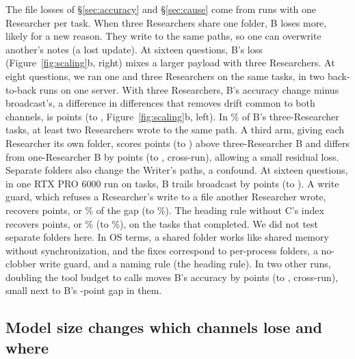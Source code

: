 \documentclass[sigplan,10pt,nonacm,review,anonymous]{acmart}
\begin{document}
The file losses of \S\ref{sec:accuracy} and \S\ref{sec:cause} come from runs with one Researcher per task. When three
Researchers share one folder, B loses more, likely for a new reason. They write to the same paths, so one can
overwrite another's notes (a lost update). At sixteen questions, B's loss (Figure~\ref{fig:scaling}b, right)
mixes a larger payload with three Researchers. At eight questions, we ran one and three Researchers on the
same \nREightFanBN tasks, in two back-to-back runs on one server. With three Researchers, B's accuracy change
minus broadcast's, a difference in differences that removes drift common to both channels, is
\nREightFanDiD points (\nREightFanDiDLo to \nREightFanDiDHi, Figure~\ref{fig:scaling}b, left). In \nREightClashB{}\% of B's three-Researcher
tasks, at least two Researchers wrote to the same path. A third arm, giving each Researcher its own folder,
scores \nREightFoldersOverB points (\nREightFoldersOverBLo to \nREightFoldersOverBHi) above three-Researcher B
and differs from one-Researcher B by \nREightFoldersVsOne points (\nREightFoldersVsOneLo to
\nREightFoldersVsOneHi, cross-run), allowing a small residual loss. Separate folders also change the Writer's
paths, a confound. At sixteen questions, in one RTX PRO 6000 run on \nRSixKSixteenBGapN tasks, B trails
broadcast by \nRSixKSixteenBGap points (\nRSixKSixteenBGapLo to \nRSixKSixteenBGapHi). A write guard, which
refuses a Researcher's write to a file another Researcher wrote, recovers \nRSixKSixteenGuardOverB points, or
\nRTwelveShareGuard{}\% of the gap (\nRTwelveShareGuardLo to \nRTwelveShareGuardHi{}\%). The heading rule
without C's index recovers \nRSixKSixteenHeadingOverB points, or \nRTwelveShareHeading{}\%
(\nRTwelveShareHeadingLo to \nRTwelveShareHeadingHi{}\%), on the \nRSixKSixteenHeadingOverBN tasks that
completed. We did not test separate folders here. In OS terms, a shared folder works like shared memory
without synchronization, and the fixes correspond to per-process folders, a no-clobber write guard, and a
naming rule (the heading rule).
In two other runs, doubling the tool budget to \nTurnsHi calls moves B's accuracy by \nRFourBTwentyFour points
(\nRFourBTwentyFourLo to \nRFourBTwentyFourHi, cross-run), small next to B's \nRFourKSixteenGapB-point gap in
them.

\subsection{Model size changes which channels lose and where}
\label{sec:size}
\end{document}
